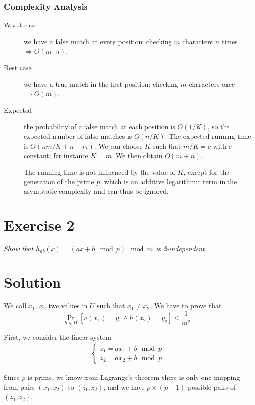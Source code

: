 \documentclass[a4paper, 12pt]{article}
\begin{document}
\subsubsection{Complexity Analysis}
\begin{description}
\item[Worst case] we have a false match at every position: checking \( m \) characters \( n \) times \(\Rightarrow O(m \cdot n)\).
\item[Best case] we have a true match in the first position: checking \( m \) characters once \(\Rightarrow O(m)\).
\item[Expected] the probability of a false match at each position is $O(1/K)$, so the expected number of false matches is $O(n / K)$. The expected running time is $O(nm/K + n + m)$. We can choose $K$ such that $m/K=c$ with $c$ constant; for instance \(K = m\). We then obtain $O(m + n)$.

  The running time is not influenced by the value of $K$, except for the generation of the prime $p$, which is an additive logarithmic term in the asymptotic complexity and can thus be ignored.
\end{description}

\section{Exercise 2}
{
	\itshape{Show that \(h_{ab}(x) = (a x + b \mod p) \mod m\) is 2-independent.}
}

\section*{Solution}
We call \(x_1\), \(x_2\) two values in \(U\) such that \(x_1 \neq x_2\).
We have to prove that
\[
	\Pr_{h \in \mathit{H}}[h(x_1) = y_1 \wedge h(x_2) = y_2] \leq \dfrac{1}{m^2}.
\]


First, we consider the linear system
\[
	\begin{aligned}
		\left\{ 
		\begin{array}{l}
			z_1 = ax_1 + b \mod p \\
			z_2 = ax_2 + b \mod p
		\end{array} 
	\right.
	\end{aligned}
\]

Since \(p\) is prime, we know from Lagrange's theorem there is only one mapping from pairs \((x_1, x_2)\) to
\((z_1, z_2)\), and we have \(p\times(p-1)\) possible pairs of \((z_1, z_2)\).
\end{document}
